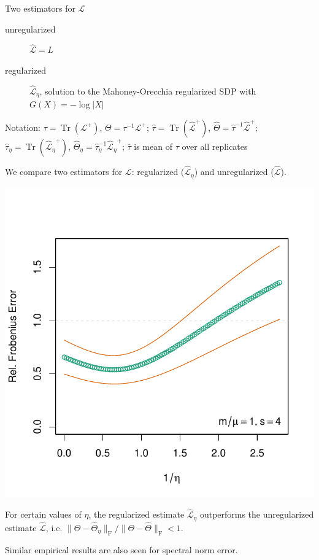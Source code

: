 \documentclass[xcolor=dvipsnames]{beamer}
\DeclareMathOperator{\Tr}{Tr}
\begin{document}
\begin{frame}
  \begin{block}{Two estimators for $\mathcal{L}$}
    \begin{description}
      \item[unregularized] $\mathcal{\hat L} = L$
      \item[regularized] $\mathcal{\hat L}_\eta$, solution to
        the Mahoney-Orecchia regularized SDP
	with $G(X) = -\log |X|$
    \end{description}

    \vspace{1em}
    Notation: 
      $\tau = \Tr(\mathcal{L}^+)$, $\Theta = \tau^{-1} \mathcal{L}^+$;
      $\hat \tau = \Tr(\mathcal{\hat L}^+)$, $\hat \Theta = \hat \tau^{-1}
\mathcal{\hat L}^+$;
      $\hat \tau_\eta = \Tr(\mathcal{\hat L_\eta}^+)$, $\hat \Theta_\eta =
\hat \tau_\eta^{-1} \mathcal{\hat L_\eta}^+$;
      $\bar \tau$ is mean of $\tau$ over all replicates
\end{block}
  We compare two estimators for $\mathcal{L}$: regularized 
  ($\mathcal{\hat L}_\eta$) and unregularized ($\mathcal{\hat L}$).
\end{frame}

\begin{frame}
	\begin{center}
	\includegraphics[scale=0.5]{plots/estimation-frob-p100}
	\end{center}

	For certain values of $\eta$, the regularized estimate
	$\mathcal{\hat L}_\eta$ outperforms the unregularized
	estimate $\mathcal{\hat L}$, i.e.
	$\|\Theta - \hat \Theta_\eta\|_\mathrm{F}
	   / \|\Theta - \hat \Theta\|_\mathrm{F} < 1$.

        Similar empirical results are also seen for spectral norm error.
\end{frame}
\end{document}
